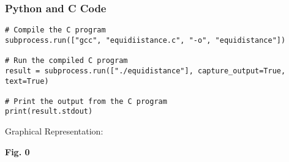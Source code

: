 \documentclass{beamer}
\begin{document}
\begin{frame}[fragile]
\frametitle{Python and C Code}

\begin{lstlisting}
# Compile the C program
subprocess.run(["gcc", "equidiistance.c", "-o", "equidistance"])

# Run the compiled C program
result = subprocess.run(["./equidistance"], capture_output=True, text=True)

# Print the output from the C program 
print(result.stdout)
\end{lstlisting}

\end{frame}

\begin{frame}{Graphical Representation:}

\begin{center}
    
    \vspace{0.5cm} %
    \textbf{Fig. 0}
\end{center}
\end{frame}
\end{document}
